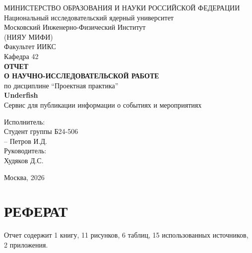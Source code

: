 \begin{titlepage}
\begin{center}
МИНИСТЕРСТВО ОБРАЗОВАНИЯ И НАУКИ РОССИЙСКОЙ ФЕДЕРАЦИИ\\
\vspace{0.5cm}
Национальный исследовательский ядерный университет\\
Московский Инженерно-Физический Институт\\
(НИЯУ МИФИ)\\
\vspace{0.5cm}
Факультет ИИКС\\
Кафедра 42\\
\vspace{1.5cm}
\textbf{ОТЧЕТ}\\
\textbf{О НАУЧНО-ИССЛЕДОВАТЕЛЬСКОЙ РАБОТЕ}\\
по дисциплине \enquote{Проектная практика}\\
\vspace{0.8cm}
\textbf{Underfish}\\
Сервис для публикации информации о событиях и мероприятиях\\
\end{center}

\vfill

\begin{flushleft}
\hspace{8cm}Исполнитель:\\
\hspace{8cm}Студент группы Б24-506\\
\hspace{8cm}-- Петров И.Д.\\
\vspace{0.5cm}
\hspace{8cm}Руководитель:\\
\hspace{8cm}Худяков Д.С.\\
\end{flushleft}

\vfill

\begin{center}
Москва, 2026
\end{center}
\end{titlepage}

\section*{РЕФЕРАТ}

Отчет содержит 1 книгу, 11 рисунков, 6 таблиц, 15 использованных источников, 2 приложения.

